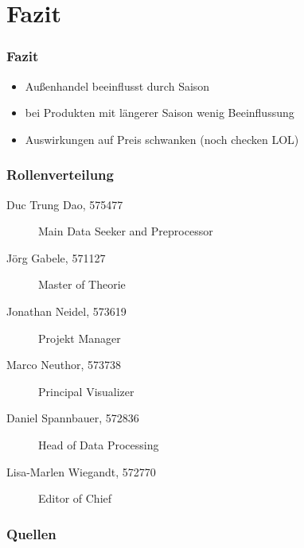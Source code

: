 \documentclass{beamer}
\begin{document}
\section{Fazit}
\begin{frame}
	\frametitle{Fazit}
	\begin{itemize}
		\item Außenhandel beeinflusst durch Saison
		\item bei Produkten mit längerer Saison wenig Beeinflussung
		\item Auswirkungen auf Preis schwanken (noch checken LOL)
	\end{itemize}
\end{frame}

\begin{frame}
	\frametitle{Rollenverteilung}
	\begin{description}
		\item[Duc Trung Dao, 575477]Main Data Seeker and Preprocessor
		\item[Jörg Gabele, 571127]Master of Theorie
		\item[Jonathan Neidel, 573619]Projekt Manager
		\item[Marco Neuthor, 573738]Principal Visualizer
		\item[Daniel Spannbauer, 572836]Head of Data Processing
		\item[Lisa-Marlen Wiegandt, 572770]Editor of Chief
	\end{description}
\end{frame}

\begin{frame}
  \frametitle{Quellen}

\end{frame}
\end{document}

